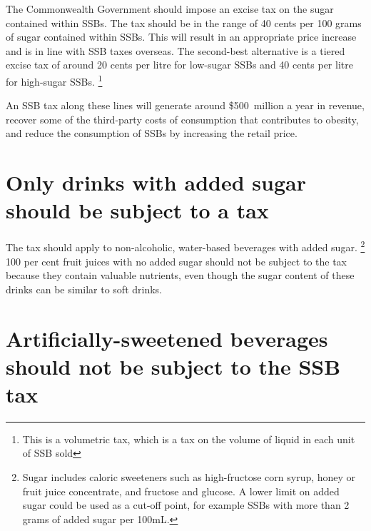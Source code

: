 \documentclass[embargoed]{grattan}
\begin{document}
The Commonwealth Government should impose an excise tax on the sugar contained within SSBs.
The tax should be in the range of 40 cents per 100 grams of sugar contained within SSBs.
This will result in an appropriate price increase and is in line with SSB taxes overseas.
The second-best alternative is a tiered excise tax of around 20 cents per litre for low-sugar SSBs and 40 cents per litre for high-sugar SSBs.%
\footnote{This is a volumetric tax, which is a tax on the volume of liquid in each unit of SSB sold}

An SSB tax along these lines will generate around \$500~million a year in revenue, recover some of the third-party costs of consumption that contributes to obesity, and reduce the consumption of SSBs by increasing the retail price.

\section{Only drinks with added sugar should be subject to a tax}\label{only-drinks-with-added-sugar-should-be-subject-to-a-tax}

The tax should apply to non-alcoholic, water-based beverages with added sugar.%
\footnote{Sugar includes caloric sweeteners such as high-fructose corn syrup, honey or fruit juice concentrate, and fructose and glucose.
A lower limit on added sugar could be used as a cut-off point, for example SSBs with more than 2 grams of added sugar per 100mL.} 100 per cent fruit juices with no added sugar should not be subject to the tax because they contain valuable nutrients, even though the sugar content of these drinks can be similar to soft drinks.

\section{Artificially-sweetened beverages should not be subject to the SSB tax}\label{artificially-sweetened-beverages-should-not-be-subject-to-the-ssb-tax}
\end{document}
